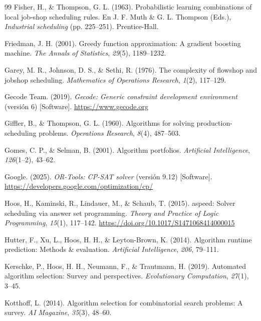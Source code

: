 \begin{thebibliography}{99}
Fisher, H., \& Thompson, G. L. (1963). Probabilistic learning combinations of
local job-shop scheduling rules. En J. F. Muth \& G. L. Thompson (Eds.),
\textit{Industrial scheduling} (pp. 225--251). Prentice-Hall.

Friedman, J. H. (2001). Greedy function approximation: A gradient boosting
machine. \textit{The Annals of Statistics}, \textit{29}(5), 1189--1232.

Garey, M. R., Johnson, D. S., \& Sethi, R. (1976). The complexity of flowshop
and jobshop scheduling. \textit{Mathematics of Operations Research},
\textit{1}(2), 117--129.

Gecode Team. (2019). \textit{Gecode: Generic constraint development
environment} (versión 6) [Software]. \url{https://www.gecode.org}

Giffler, B., \& Thompson, G. L. (1960). Algorithms for solving
production-scheduling problems. \textit{Operations Research}, \textit{8}(4),
487--503.

Gomes, C. P., \& Selman, B. (2001). Algorithm portfolios. \textit{Artificial
Intelligence}, \textit{126}(1--2), 43--62.

Google. (2025). \textit{OR-Tools: CP-SAT solver} (versión 9.12) [Software].
\url{https://developers.google.com/optimization/cp/}

Hoos, H., Kaminski, R., Lindauer, M., \& Schaub, T. (2015). aspeed: Solver
scheduling via answer set programming. \textit{Theory and Practice of Logic
Programming}, \textit{15}(1), 117--142.
\url{https://doi.org/10.1017/S1471068414000015}

Hutter, F., Xu, L., Hoos, H. H., \& Leyton-Brown, K. (2014). Algorithm runtime
prediction: Methods \& evaluation. \textit{Artificial Intelligence},
\textit{206}, 79--111.

Kerschke, P., Hoos, H. H., Neumann, F., \& Trautmann, H. (2019). Automated
algorithm selection: Survey and perspectives. \textit{Evolutionary
Computation}, \textit{27}(1), 3--45.

Kotthoff, L. (2014). Algorithm selection for combinatorial search problems: A
survey. \textit{AI Magazine}, \textit{35}(3), 48--60.


\end{thebibliography}
